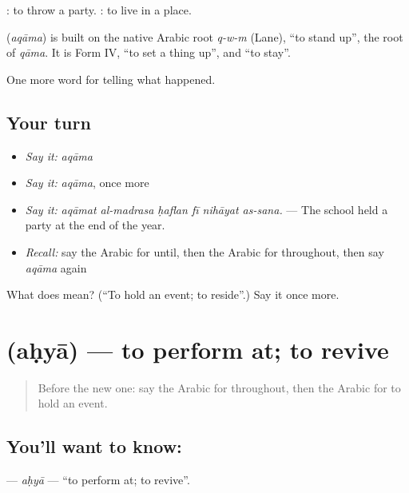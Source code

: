 : to throw a party.  : to live in a place.

\begin{cousinweb}
\textbf{} (\emph{aqāma}) is built on the native Arabic root \emph{q-w-m} (Lane), \textquotedblleft{}to stand up\textquotedblright{}, the root of \emph{qāma}. It is Form IV, \textquotedblleft{}to set a thing up\textquotedblright{}, and \textquotedblleft{}to stay\textquotedblright{}.
\end{cousinweb}

\begin{grammarlens}[title={What you've built}]
One more word for telling what happened.
\end{grammarlens}

\subsection*{Your turn}
\begin{itemize}
\raggedright
  \item \emph{Say it:} \emph{aqāma}
  \item \emph{Say it:} \emph{aqāma}, once more
  \item \emph{Say it:} \emph{aqāmat al-madrasa ḥaflan fī nihāyat as-sana.} — The school held a party at the end of the year.
  \item \emph{Recall:} say the Arabic for until, then the Arabic for throughout, then say \emph{aqāma} again
\end{itemize}

\begin{tcolorbox}[breakable,colback=teal!4,colframe=teal!35!black,title={Before you move on}]
What does  mean? (\textquotedblleft{}To hold an event; to reside\textquotedblright{}.) Say it once more.
\end{tcolorbox}
\section[\texorpdfstring{\ar{أحيا} (aḥyā)}{أحيا (aḥyā)}]{ (aḥyā) — to perform at; to revive}

\label{lesson:AR-C328-ahya}



\begin{quote}
Before the new one: say the Arabic for throughout, then the Arabic for to hold an event.
\end{quote}

\subsection*{You'll want to know: }
\textbf{} — \emph{aḥyā} — \textquotedblleft{}to perform at; to revive\textquotedblright{}.

